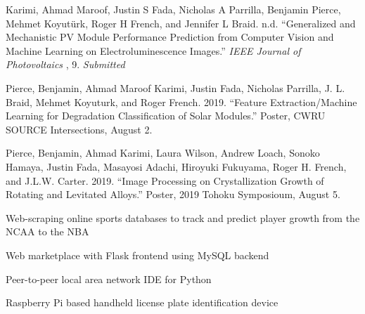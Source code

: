 \documentclass[10pt]{article}
\begin{document}
	{\begin{newitemize}
		\item{Karimi, Ahmad Maroof, Justin S Fada, Nicholas A Parrilla, { Benjamin Pierce}, Mehmet Koyutürk, Roger H French, and Jennifer L Braid. n.d. “Generalized and Mechanistic PV Module Performance Prediction from Computer Vision and Machine Learning on Electroluminescence Images.” \textit{IEEE Journal of Photovoltaics} , 9.} \textit{Submitted}
		\item{{ Pierce, Benjamin}, Ahmad Maroof Karimi, Justin Fada, Nicholas Parrilla, J. L. Braid, Mehmet Koyuturk, and Roger French. 2019. “Feature Extraction/Machine Learning for Degradation Classification of Solar Modules.” Poster, CWRU SOURCE Intersections, August 2.}
		\item{{ Pierce, Benjamin}, Ahmad Karimi, Laura Wilson, Andrew Loach, Sonoko Hamaya, Justin Fada, Masayosi Adachi, Hiroyuki Fukuyama, Roger H. French, and J.L.W. Carter. 2019. “Image Processing on Crystallization Growth of Rotating and Levitated Alloys.” Poster, 2019 Tohoku Symposioum, August 5.}
	\end{newitemize}}
{}
	{\begin{newitemize}
		\item{Web-scraping online sports databases to track and predict player growth from the NCAA to the NBA}
		\item{Web marketplace with Flask frontend using MySQL backend}
		\item{Peer-to-peer local area network IDE for Python}
		\item{Raspberry Pi based handheld license plate identification device}
		  
	\end{newitemize}}
\end{document}
